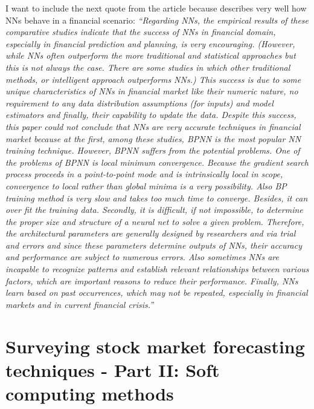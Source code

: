 I want to include the next quote from the article because describes
very well how NNs behave in a financial scenario: \textit{``Regarding
  NNs, the empirical results of these comparative studies indicate
  that the success of NNs in financial domain, especially in financial
  prediction and planning, is very encouraging. (However, while NNs
  often outperform the more traditional and statistical approaches but
  this is not always the case. There are some studies in which other
  traditional methods, or intelligent approach outperforms NNs.) This
  success is due to some unique characteristics of NNs in financial
  market like their numeric nature, no requirement to any data
  distribution assumptions (for inputs) and model estimators and
  finally, their capability to update the data. Despite this success,
  this paper could not conclude that NNs are very accurate techniques
  in financial market because at the first, among these studies, BPNN
  is the most popular NN training technique. However, BPNN suffers
  from the potential problems. One of the problems of BPNN is local
  minimum convergence. Because the gradient search process proceeds in
  a point-to-point mode and is intrinsically local in scope,
  convergence to local rather than global minima is a very
  possibility. Also BP training method is very slow and takes too much
  time to converge. Besides, it can over fit the training data.
  Secondly, it is difficult, if not impossible, to determine the
  proper size and structure of a neural net to solve a given problem.
  Therefore, the architectural parameters are generally designed by
  researchers and via trial and errors and since these parameters
  determine outputs of NNs, their accuracy and performance are subject
  to numerous errors. Also sometimes NNs are incapable to recognize
  patterns and establish relevant relationships between various
  factors, which are important reasons to reduce their performance.
  Finally, NNs learn based on past occurrences, which may not be
  repeated, especially in financial markets and in current financial
  crisis.''}


\section[\cite{atsalakis2009surveying}]{Surveying stock market
  forecasting techniques - Part II: Soft computing methods}
\label{sec:surveing-stock-market-forecasting-techniques:part2}


